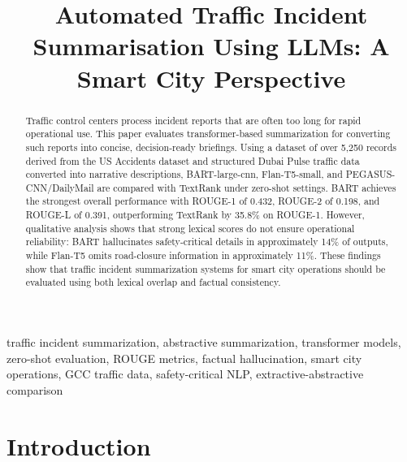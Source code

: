 \documentclass[10pt,conference]{IEEEtran}
\begin{document}
\title{Automated Traffic Incident Summarisation Using LLMs: A Smart City Perspective}

\author{
}

\maketitle

\begin{abstract}
Traffic control centers process incident reports that are often too long for rapid operational use. This paper evaluates transformer-based summarization for converting such reports into concise, decision-ready briefings. Using a dataset of over 5,250 records derived from the US Accidents dataset and structured Dubai Pulse traffic data converted into narrative descriptions, BART-large-cnn, Flan-T5-small, and PEGASUS-CNN/DailyMail are compared with TextRank under zero-shot settings. BART achieves the strongest overall performance with ROUGE-1 of 0.432, ROUGE-2 of 0.198, and ROUGE-L of 0.391, outperforming TextRank by 35.8\% on ROUGE-1. However, qualitative analysis shows that strong lexical scores do not ensure operational reliability: BART hallucinates safety-critical details in approximately 14\% of outputs, while Flan-T5 omits road-closure information in approximately 11\%. These findings show that traffic incident summarization systems for smart city operations should be evaluated using both lexical overlap and factual consistency.
\end{abstract}

\begin{IEEEkeywords}
traffic incident summarization, abstractive summarization, transformer models, zero-shot evaluation, ROUGE metrics, factual hallucination, smart city operations, GCC traffic data, safety-critical NLP, extractive-abstractive comparison
\end{IEEEkeywords}


\section{Introduction}
\vspace{-1.5mm}
\end{document}
